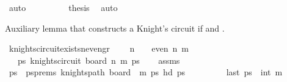 \begin{isabellebody}
\ auto\isanewline
\ \ \ \ \ \ \isamarkupfalse%
\ \isamarkupfalse%
\ {\isacharquery}{\kern0pt}thesis\ \isamarkupfalse%
\ auto\isanewline
\ \ \ \ \isamarkupfalse%
\isanewline
\ \ \isamarkupfalse%
\isanewline
{}\isamarkupfalse%
%
\endisatagproof
{\isafoldproof}%
%
\isadelimproof
%
\endisadelimproof
%
\begin{isamarkuptext}%
Auxiliary lemma that constructs a Knight's circuit if  and .%
\end{isamarkuptext}\isamarkuptrue%
\isamarkupfalse%
\ knights{\isacharunderscore}{\kern0pt}circuit{\isacharunderscore}{\kern0pt}exists{\isacharunderscore}{\kern0pt}n{\isacharunderscore}{\kern0pt}even{\isacharunderscore}{\kern0pt}gr{\isacharunderscore}{\kern0pt}{}{}{\isacharcolon}{\kern0pt}\ \isanewline
\ \ \ {\isachardoublequoteopen}n\ {\isasymge}\ {}{}\ {\isasymand}\ even\ n{\isachardoublequoteclose}\ {\isachardoublequoteopen}m\ {\isasymge}\ {}{\isachardoublequoteclose}\isanewline
\ \ \ {\isachardoublequoteopen}{\isasymexists}ps{\isachardot}{\kern0pt}\ knights{\isacharunderscore}{\kern0pt}circuit\ {\isacharparenleft}{\kern0pt}board\ n\ m{\isacharparenright}{\kern0pt}\ ps{\isachardoublequoteclose}\isanewline
%
\isadelimproof
\ \ %
\endisadelimproof
%
\isatagproof
{}\isamarkupfalse%
\ assms\isanewline
{}\isamarkupfalse%
\ {\isacharminus}{\kern0pt}\isanewline
\ \ \isamarkupfalse%
\ ps\ \ psprems{\isacharcolon}{\kern0pt}\ {\isachardoublequoteopen}knights{\isacharunderscore}{\kern0pt}path\ {\isacharparenleft}{\kern0pt}board\ {}\ m{\isacharparenright}{\kern0pt}\ ps\ {\isachardoublequoteopen}hd\ ps\ {\isacharequal}{\kern0pt}\ {\isacharparenleft}{\kern0pt}{}{\isacharcomma}{\kern0pt}{}{\isacharparenright}{\kern0pt}{\isachardoublequoteclose}\ \isanewline
\ \ \ \ \ \ {\isachardoublequoteopen}last\ ps\ {\isacharequal}{\kern0pt}\ {\isacharparenleft}{\kern0pt}{}{\isacharcomma}{\kern0pt}int\ m{\isacharminus}{\kern0pt}{}{\isacharparenright}{\kern0pt}{\isachardoublequoteclose}\isanewline
\ \ \ \ \isamarkupfalse%

\end{isabellebody}
